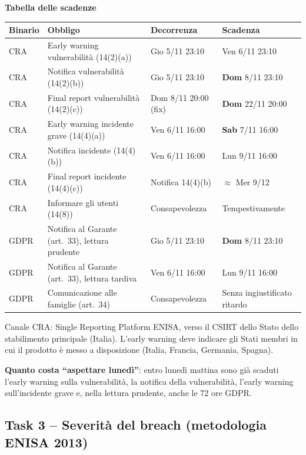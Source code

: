 \begin{center}
\textbf{Tabella delle scadenze}\par\smallskip
\small
\begin{tabularx}{\linewidth}{l X l l}
\toprule
\textbf{Binario} & \textbf{Obbligo} & \textbf{Decorrenza} & \textbf{Scadenza} \\ \midrule
CRA  & Early warning vulnerabilità (14(2)(a))     & Gio 5/11 23:10       & Ven 6/11 23:10 \\
CRA  & Notifica vulnerabilità (14(2)(b))          & Gio 5/11 23:10       & \textbf{Dom} 8/11 23:10 \\
CRA  & Final report vulnerabilità (14(2)(c))      & Dom 8/11 20:00 (fix) & \textbf{Dom} 22/11 20:00 \\
CRA  & Early warning incidente grave (14(4)(a))   & Ven 6/11 16:00       & \textbf{Sab} 7/11 16:00 \\
CRA  & Notifica incidente (14(4)(b))              & Ven 6/11 16:00       & Lun 9/11 16:00 \\
CRA  & Final report incidente (14(4)(c))          & Notifica 14(4)(b)    & $\approx$ Mer 9/12 \\
CRA  & Informare gli utenti (14(8))               & Consapevolezza       & Tempestivamente \\
GDPR & Notifica al Garante (art.~33), lettura prudente & Gio 5/11 23:10  & \textbf{Dom} 8/11 23:10 \\
GDPR & Notifica al Garante (art.~33), lettura tardiva  & Ven 6/11 16:00  & Lun 9/11 16:00 \\
GDPR & Comunicazione alle famiglie (art.~34)      & Consapevolezza       & Senza ingiustificato ritardo \\
\bottomrule
\end{tabularx}
\end{center}

\noindent Canale CRA: Single Reporting Platform ENISA, verso il CSIRT dello Stato dello stabilimento
principale (Italia). L'early warning deve indicare gli Stati membri in cui il prodotto è messo a
disposizione (Italia, Francia, Germania, Spagna).

\noindent\textbf{Quanto costa ``aspettare lunedì''}: entro lunedì mattina sono già scaduti l'early
warning sulla vulnerabilità, la notifica della vulnerabilità, l'early warning sull'incidente grave e,
nella lettura prudente, anche le 72 ore GDPR.

\subsection{Task 3 -- Severità del breach (metodologia ENISA 2013)}

